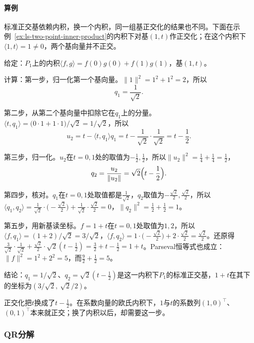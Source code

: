 \paragraph{算例}
标准正交基依赖内积，换一个内积，同一组基正交化的结果也不同。下面在示例~\ref{ex:ls-two-point-inner-product}的内积下对基$(1,t)$作正交化；在这个内积下$\langle1,t\rangle=1\neq0$，两个基向量并不正交。
\begin{example}
\label{ex:ls-gram-schmidt-two-point}
给定：$P_1$上的内积$\langle f,g\rangle=f(0)g(0)+f(1)g(1)$，基$(1,t)$。

计算：第一步，归一化第一个基向量。$\lVert1\rVert^2=1^2+1^2=2$，所以
\[
 q_1=\frac1{\sqrt2}.
\]

第二步，从第二个基向量中扣除它在$q_1$上的分量。$\langle t,q_1\rangle=\bigl(0\cdot1+1\cdot1\bigr)/\sqrt2=1/\sqrt2$，所以
\[
 u_2=t-\langle t,q_1\rangle q_1=t-\frac1{\sqrt2}\cdot\frac1{\sqrt2}=t-\frac12.
\]

第三步，归一化。$u_2$在$t=0,1$处的取值为$-\tfrac12,\tfrac12$，所以$\lVert u_2\rVert^2=\tfrac14+\tfrac14=\tfrac12$，
\[
 q_2=\frac{u_2}{\lVert u_2\rVert}=\sqrt2\Bigl(t-\frac12\Bigr).
\]

第四步，核对。$q_1$在$t=0,1$处取值都是$\tfrac1{\sqrt2}$，$q_2$取值为$-\tfrac{\sqrt2}2,\tfrac{\sqrt2}2$，所以$\langle q_1,q_2\rangle=\tfrac1{\sqrt2}\cdot\bigl(-\tfrac{\sqrt2}2\bigr)+\tfrac1{\sqrt2}\cdot\tfrac{\sqrt2}2=0$，$\lVert q_2\rVert^2=\tfrac12+\tfrac12=1$。

第五步，用新基读坐标。$f=1+t$在$t=0,1$处取值为$1,2$，所以$\langle f,q_1\rangle=(1+2)/\sqrt2=3/\sqrt2$，$\langle f,q_2\rangle=1\cdot\bigl(-\tfrac{\sqrt2}2\bigr)+2\cdot\tfrac{\sqrt2}2=\tfrac{\sqrt2}2$。还原得$\tfrac3{\sqrt2}\cdot\tfrac1{\sqrt2}+\tfrac{\sqrt2}2\cdot\sqrt2(t-\tfrac12)=\tfrac32+t-\tfrac12=1+t$。Parseval恒等式也成立：$\lVert f\rVert^2=1^2+2^2=5$，而$\tfrac92+\tfrac12=5$。

结论：$q_1=1/\sqrt2$、$q_2=\sqrt2(t-\tfrac12)$是这一内积下$P_1$的标准正交基，$1+t$在其下的坐标为$(3/\sqrt2,\ \sqrt2/2)$。
\end{example}
正交化把$t$换成了$t-\tfrac12$。在系数向量的欧氏内积下，$1$与$t$的系数列$(1,0)^\top$、$(0,1)^\top$本来就正交；换了内积以后，却需要这一步。

\subsubsection{QR分解}

